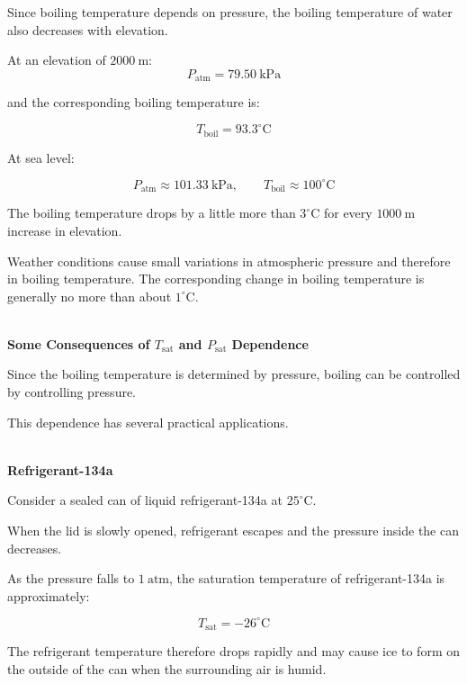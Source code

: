 \documentclass[12pt]{article}
\begin{document}
Since boiling temperature depends on pressure, the boiling temperature of water also decreases with elevation.

At an elevation of $2000~\mathrm{m}$:
\begin{equation*}
P_{\mathrm{atm}}=79.50~\mathrm{kPa}
\end{equation*}

and the corresponding boiling temperature is:

\begin{equation*}
T_{\mathrm{boil}}=93.3^\circ\mathrm{C}
\end{equation*}

At sea level:

\begin{equation*}
P_{\mathrm{atm}}\approx101.33~\mathrm{kPa},
\qquad
T_{\mathrm{boil}}\approx100^\circ\mathrm{C}
\end{equation*}

The boiling temperature drops by a little more than $3^\circ\mathrm{C}$ for every $1000~\mathrm{m}$ increase in elevation.

Weather conditions cause small variations in atmospheric pressure and therefore in boiling temperature. The corresponding change in boiling temperature is generally no more than about $1^\circ\mathrm{C}$.

\textbf{\\ Some Consequences of $T_{\mathrm{sat}}$ and $P_{\mathrm{sat}}$ Dependence}

Since the boiling temperature is determined by pressure, boiling can be controlled by controlling pressure.

This dependence has several practical applications.

\textbf{\\ Refrigerant-134a}

Consider a sealed can of liquid refrigerant-134a at $25^\circ\mathrm{C}$.

When the lid is slowly opened, refrigerant escapes and the pressure inside the can decreases.

As the pressure falls to $1~\mathrm{atm}$, the saturation temperature of refrigerant-134a is approximately:

\begin{equation*}
T_{\mathrm{sat}}=-26^\circ\mathrm{C}
\end{equation*}

The refrigerant temperature therefore drops rapidly and may cause ice to form on the outside of the can when the surrounding air is humid.
\end{document}

